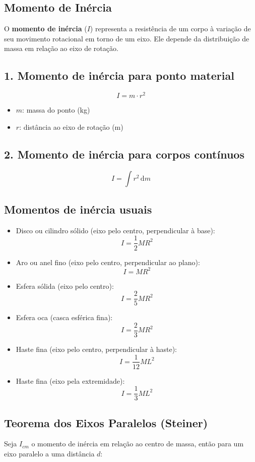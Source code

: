 \documentclass[a4paper,12pt]{article}
\begin{document}
\begin{multicols}{2}
\section{Momento de Inércia}

O \textbf{momento de inércia} ($I$) representa a resistência de um corpo à variação de seu movimento rotacional em torno de um eixo. Ele depende da distribuição de massa em relação ao eixo de rotação.

\subsection*{1. Momento de inércia para ponto material}
\[
I = m \cdot r^2
\]
\begin{itemize}
    \item $m$: massa do ponto (kg)
    \item $r$: distância ao eixo de rotação (m)
\end{itemize}

\subsection{2. Momento de inércia para corpos contínuos}
\[
I = \int r^2 \, \mathrm{d}m
\]

\subsection{Momentos de inércia usuais}

\begin{itemize}
    \item Disco ou cilindro sólido (eixo pelo centro, perpendicular à base):
    \[
    I = \frac{1}{2} M R^2
    \]
    \item Aro ou anel fino (eixo pelo centro, perpendicular ao plano):
    \[
    I = M R^2
    \]
    \item Esfera sólida (eixo pelo centro):
    \[
    I = \frac{2}{5} M R^2
    \]
    \item Esfera oca (casca esférica fina):
    \[
    I = \frac{2}{3} M R^2
    \]
    \item Haste fina (eixo pelo centro, perpendicular à haste):
    \[
    I = \frac{1}{12} M L^2
    \]
    \item Haste fina (eixo pela extremidade):
    \[
    I = \frac{1}{3} M L^2
    \]
\end{itemize}

\subsection{Teorema dos Eixos Paralelos (Steiner)}
Seja $I_{cm}$ o momento de inércia em relação ao centro de massa, então para um eixo paralelo a uma distância $d$:


\end{multicols}
\end{document}
